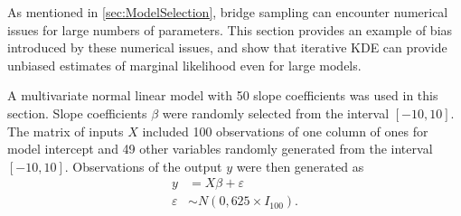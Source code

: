\documentclass[twocolumn]{article}
\newcommand{\ep}{\varepsilon}
\begin{document}
As mentioned in \cref{sec:ModelSelection}, bridge sampling can encounter numerical issues for large numbers of parameters. This section provides an example of bias introduced by these numerical issues, and show that iterative KDE can provide unbiased estimates of marginal likelihood even for large models.

A multivariate normal linear model with 50 slope coefficients was used in this section. Slope coefficients $\beta$ were randomly selected from the interval $[-10, 10]$. The matrix of inputs $X$ included 100 observations of one column of ones for model intercept and 49 other variables randomly generated from the interval $[-10, 10]$. Observations of the output $y$ were then generated as
\begin{subequations}
	\begin{align}
	y &= X\beta + \ep\\
	\ep &\sim N(0, 625\times I_{100}).
	\end{align}
\end{subequations}


\end{document}
